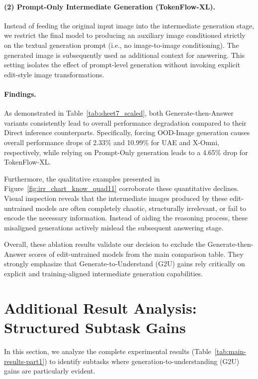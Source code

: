 \documentclass{article}
\theoremstyle{plain}
\theoremstyle{definition}
\theoremstyle{remark}
\begin{document}
\paragraph{(2) Prompt-Only Intermediate Generation (TokenFlow-XL).}
Instead of feeding the original input image into the intermediate generation stage, we restrict the final model to producing an auxiliary image conditioned strictly on the textual generation prompt (i.e., no image-to-image conditioning). The generated image is subsequently used as additional context for answering. This setting isolates the effect of prompt-level generation without invoking explicit edit-style image transformations.

\paragraph{Findings.}
As demonstrated in Table~\ref{tab:sheet7_scaled}, both Generate-then-Answer variants consistently lead to overall performance degradation compared to their Direct inference counterparts. Specifically, forcing OOD-Image generation causes overall performance drops of 2.33\% and 10.99\% for UAE and X-Omni, respectively, while relying on Prompt-Only generation leads to a 4.65\% drop for TokenFlow-XL. 

Furthermore, the qualitative examples presented in Figure~\ref{fig:irr_chart_know_quad11} corroborate these quantitative declines. Visual inspection reveals that the intermediate images produced by these edit-untrained models are often completely chaotic, structurally irrelevant, or fail to encode the necessary information. Instead of aiding the reasoning process, these misaligned generations actively mislead the subsequent answering stage.

Overall, these ablation results validate our decision to exclude the Generate-then-Answer scores of edit-untrained models from the main comparison table. They strongly emphasize that Generate-to-Understand (G2U) gains rely critically on explicit and training-aligned intermediate generation capabilities.

\section{Additional Result Analysis: Structured Subtask Gains}
\label{sec:appendix_subtask_analysis}

In this section, we analyze the complete experimental results (Table~\ref{tab:main-results-part1}) to identify subtasks where generation-to-understanding (G2U) gains are particularly evident.
\end{document}

